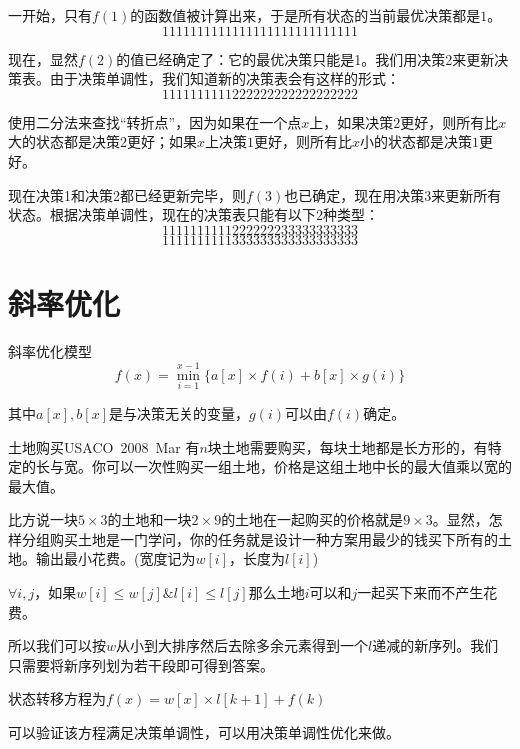 \documentclass[9pt,dvipsnames,table,UTF8,aspectratio=169]{beamer}
\begin{document}
\begin{frame}[shrink]
	一开始，只有$f(1)$的函数值被计算出来，于是所有状态的当前最优决策都是$1$。$$1111111111111111111111111111$$

	现在，显然$f(2)$的值已经确定了：它的最优决策只能是1。我们用决策2来更新决策表。由于决策单调性，我们知道新的决策表会有这样的形式：$$1111111111222222222222222222$$

	使用二分法来查找“转折点”，因为如果在一个点$x$上，如果决策$2$更好，则所有比$x$大的状态都是决策$2$更好；如果$x$上决策$1$更好，则所有比$x$小的状态都是决策$1$更好。

	现在决策1和决策2都已经更新完毕，则$f(3)$也已确定，现在用决策$3$来更新所有状态。根据决策单调性，现在的决策表只能有以下$2$种类型：$$1111111111222222233333333333$$ $$1111111111333333333333333333$$
\end{frame}

\section{斜率优化}
\begin{frame}{斜率优化模型}
	$$f(x) = \min_{i = 1}^{x - 1} \{a[x] \times f(i) + b[x] \times g(i)\}$$

	其中$a[x],b[x]$是与决策无关的变量，$g(i)$可以由$f(i)$确定。
\end{frame}

\begin{frame}{土地购买}{USACO\ 2008\ Mar}
	       有$n$块土地需要购买，每块土地都是长方形的，有特定的长与宽。你可以一次性购买一组土地，价格是这组土地中长的最大值乘以宽的最大值。
	       
	       比方说一块$5 \times 3$的土地和一块$2 \times 9$的土地在一起购买的价格就是$9 \times 3$。显然，怎样分组购买土地是一门学问，你的任务就是设计一种方案用最少的钱买下所有的土地。输出最小花费。(宽度记为$w[i]$，长度为$l[i]$)
\end{frame}

\begin{frame}
	$\forall i, j$，如果$w[i] \le w[j] \& l[i] \le l[j]$那么土地$i$可以和$j$一起买下来而不产生花费。
	
	所以我们可以按$w$从小到大排序然后去除多余元素得到一个$l$递减的新序列。我们只需要将新序列划为若干段即可得到答案。

	\pause
	状态转移方程为$f(x) = w[x] \times l[k + 1] + f(k)$

	\pause
	可以验证该方程满足决策单调性，可以用决策单调性优化来做。
\end{frame}
\end{document}
